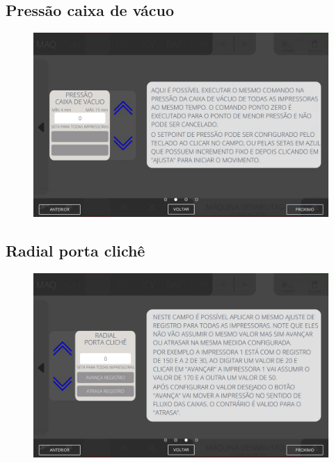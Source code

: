 \newpage
\thispagestyle{fancy}
\vspace*{40 pt}
\subsection{Pressão caixa de vácuo}
\vspace*{\fill}
\begin{figure}[h]
    \centering
    \includegraphics[width=576 px,height=360 px]{src/imagesICV/04-printters/01-printters/settings/11.png}
\end{figure}
\vspace*{\fill}

\newpage
\thispagestyle{fancy}
\vspace*{40 pt}
\subsection{Radial porta clichê}
\vspace*{\fill}
\begin{figure}[h]
    \centering
    \includegraphics[width=576 px,height=360 px]{src/imagesICV/04-printters/01-printters/settings/12.png}
\end{figure}
\vspace*{\fill}


